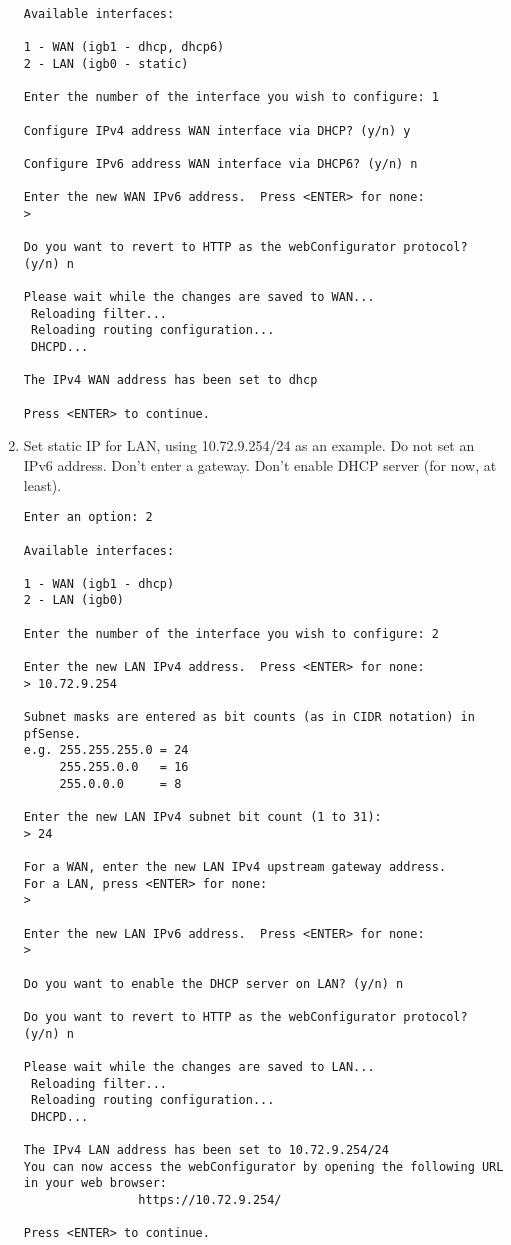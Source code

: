 \begin{enumerate}
\begin{verbatim}
Available interfaces:

1 - WAN (igb1 - dhcp, dhcp6)
2 - LAN (igb0 - static)

Enter the number of the interface you wish to configure: 1

Configure IPv4 address WAN interface via DHCP? (y/n) y

Configure IPv6 address WAN interface via DHCP6? (y/n) n

Enter the new WAN IPv6 address.  Press <ENTER> for none:
> 

Do you want to revert to HTTP as the webConfigurator protocol? (y/n) n

Please wait while the changes are saved to WAN...
 Reloading filter...
 Reloading routing configuration...
 DHCPD...

The IPv4 WAN address has been set to dhcp

Press <ENTER> to continue.
\end{verbatim}
 \item Set static IP for LAN, using 10.72.9.254/24 as an example. Do not set an IPv6 address. Don't enter a gateway. Don't enable DHCP server (for now, at least).
\begin{verbatim}
Enter an option: 2

Available interfaces:

1 - WAN (igb1 - dhcp)
2 - LAN (igb0)

Enter the number of the interface you wish to configure: 2

Enter the new LAN IPv4 address.  Press <ENTER> for none:
> 10.72.9.254

Subnet masks are entered as bit counts (as in CIDR notation) in pfSense.
e.g. 255.255.255.0 = 24
     255.255.0.0   = 16
     255.0.0.0     = 8

Enter the new LAN IPv4 subnet bit count (1 to 31):
> 24

For a WAN, enter the new LAN IPv4 upstream gateway address.
For a LAN, press <ENTER> for none:
> 

Enter the new LAN IPv6 address.  Press <ENTER> for none:
> 

Do you want to enable the DHCP server on LAN? (y/n) n

Do you want to revert to HTTP as the webConfigurator protocol? (y/n) n

Please wait while the changes are saved to LAN...
 Reloading filter...
 Reloading routing configuration...
 DHCPD...

The IPv4 LAN address has been set to 10.72.9.254/24
You can now access the webConfigurator by opening the following URL in your web browser:
                https://10.72.9.254/

Press <ENTER> to continue.
\end{verbatim}
\end{enumerate}

